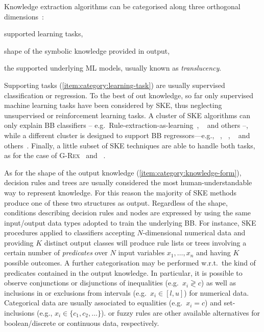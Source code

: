 \documentclass[
]{ceurart}
\begin{document}
Knowledge extraction algorithms can be categorised along three orthogonal dimensions~\cite{xaisurvey-ia14}:
%
\begin{inlinelist}
    \item\label{item:category:learning-task} supported learning tasks,
    \item\label{item:category:knowledge-form} shape of the symbolic knowledge provided in output,
    \item\label{item:category:translucency} the supported underlying ML models, usually known as \emph{translucency}.
\end{inlinelist}

Supporting tasks (\cref{item:category:learning-task}) are usually supervised classification or regression.
%
To the best of out knowledge, so far only supervised machine learning tasks have been considered by SKE, thus neglecting unsupervised or reinforcement learning tasks.
%
A cluster of SKE algorithms can only explain BB classifiers -- e.g.\ Rule-extraction-as-learning~\cite{craven1994using}, \trepan~\cite{craven1996extracting} and others \cite{barakat2005eclectic,martens2007comprehensible} --, while a different cluster is designed to support BB regressors---e.g., \iter~\cite{huysmans2006iter}, \gridex~\cite{gridex-extraamas2021}, \gridrex{}~\cite{gridrex-kr2022} and others~\cite{setiono2002extraction,schmitz1999ann,saito2002extracting}.
%
Finally, a little subset of SKE techniques are able to handle both tasks, as for the case of \textsc{G-Rex}~\cite{grex-icdm2008} and \cart~\cite{breiman1984classification}.

As for the shape of the output knowledge (\cref{item:category:knowledge-form}), decision rules \cite{freitas2014comprehensible,huysmans2011empirical,murphy1991id2} and trees \cite{quinlan1993c4,simplifyingdt-ijmms27} are usually considered the most human-understandable way to represent knowledge.
%
For this reason the majority of SKE methods produce one of these two structures as output.
%
Regardless of the shape, conditions describing decision rules and nodes are expressed by using the same input/output data types adopted to train the underlying BB.
%
For instance, SKE procedures applied to classifiers accepting $N$-dimensional numerical data and providing $K$ distinct output classes will produce rule lists or trees involving a certain number of \emph{predicates} over $N$ input variables $x_1, \ldots, x_n$ and having $K$ possible outcomes.
%
A further categorisation may be performed w.r.t.\ the kind of predicates contained in the output knowledge.
%
In particular, it is possible to observe conjunctions or disjunctions of inequalities (e.g.\ $x_i \gtrless c$) as well as inclusions in or exclusions from intervals (e.g.\ $x_i \in [l, u]$) for numerical data.
%
Categorical data are usually associated to equalities (e.g.\ $x_i = c$) and set-inclusions (e.g., $x_i \in \{c_1, c_2, \ldots \}$).
%
\mofn{} or fuzzy rules are other available alternatives for boolean/discrete or continuous data, respectively.
\end{document}
